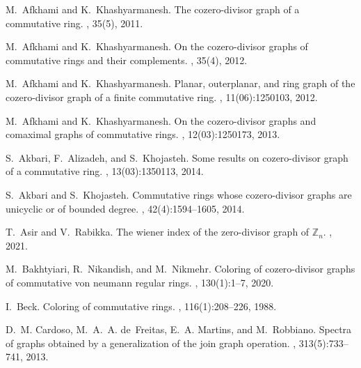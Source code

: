 \documentclass{amsart}
\theoremstyle{plain}
\theoremstyle{definition}
\theoremstyle{remark}
\begin{document}
\begin{thebibliography}{10}

M.~Afkhami and K.~Khashyarmanesh.
\newblock The cozero-divisor graph of a commutative ring.
, 35(5), 2011.

M.~Afkhami and K.~Khashyarmanesh.
\newblock On the cozero-divisor graphs of commutative rings and their
  complements.
, 35(4),
  2012.

M.~Afkhami and K.~Khashyarmanesh.
\newblock Planar, outerplanar, and ring graph of the cozero-divisor graph of a
  finite commutative ring.
, 11(06):1250103, 2012.

M.~Afkhami and K.~Khashyarmanesh.
\newblock On the cozero-divisor graphs and comaximal graphs of commutative
  rings.
, 12(03):1250173, 2013.

S.~Akbari, F.~Alizadeh, and S.~Khojasteh.
\newblock Some results on cozero-divisor graph of a commutative ring.
, 13(03):1350113, 2014.

S.~Akbari and S.~Khojasteh.
\newblock Commutative rings whose cozero-divisor graphs are unicyclic or of
  bounded degree.
, 42(4):1594--1605, 2014.

T.~Asir and V.~Rabikka.
\newblock The wiener index of the zero-divisor graph of $\mathbb{Z}_n$.
, 2021.

M.~Bakhtyiari, R.~Nikandish, and M.~Nikmehr.
\newblock Coloring of cozero-divisor graphs of commutative von neumann regular
  rings.
, 130(1):1--7, 2020.

I.~Beck.
\newblock Coloring of commutative rings.
, 116(1):208--226, 1988.

D.~M. Cardoso, M.~A.~A. de~Freitas, E.~A. Martins, and M.~Robbiano.
\newblock Spectra of graphs obtained by a generalization of the join graph
  operation.
, 313(5):733--741, 2013.


\end{thebibliography}
\end{document}
